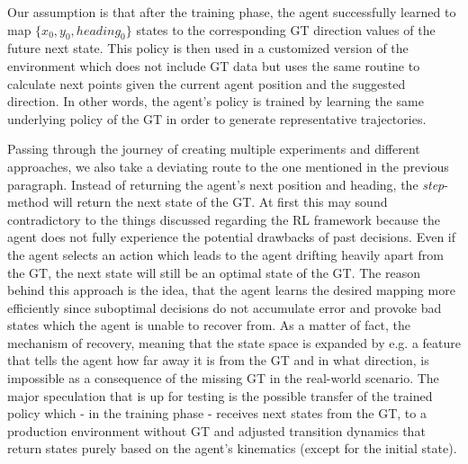 \par
Our assumption is that after the training phase, the agent successfully learned to map $\{x_0,y_0,heading_0\}$ states to the corresponding GT direction values of the future next state. This policy is then used in a customized version of the environment which does not include GT data but uses the same routine to calculate next points given the current agent position and the suggested direction. In other words, the agent's policy is trained by learning the same underlying policy of the GT in order to generate representative trajectories.
\par
Passing through the journey of creating multiple experiments and different approaches, we also take a deviating route to the one mentioned in the previous paragraph. Instead of returning the agent's next position and heading, the \textit{step}-method will return the next state of the GT. At first this may sound contradictory to the things discussed regarding the RL framework because the agent does not fully experience the potential drawbacks of past decisions. Even if the agent selects an action which leads to the agent drifting heavily apart from the GT, the next state will still be an optimal state of the GT. The reason behind this approach is the idea, that the agent learns the desired mapping more efficiently since suboptimal decisions do not accumulate error and provoke bad states which the agent is unable to recover from. As a matter of fact, the mechanism of recovery, meaning that the state space is expanded by e.g. a feature that tells the agent how far away it is from the GT and in what direction, is impossible as a consequence of the missing GT in the real-world scenario. The major speculation that is up for testing is the possible transfer of the trained policy which - in the training phase - receives next states from the GT, to a production environment without GT and adjusted transition dynamics that return states purely based on the agent's kinematics (except for the initial state).